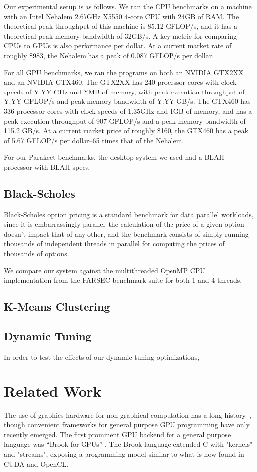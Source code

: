 \documentclass[preprint]{sigplanconf}
\begin{document}
Our experimental setup is as follows.  We ran the CPU benchmarks on a machine
with an Intel Nehalem 2.67GHz X5550 4-core CPU with 24GB of RAM.  The
theoretical peak throughput of this machine is 85.12 GFLOP/s, and it has a
theoretical peak memory bandwidth of 32GB/s.  A key metric for comparing CPUs
to GPUs is also performance per dollar.  At a current market rate of roughly
\$983, the Nehalem has a peak of 0.087 GFLOP/s per dollar.

For all GPU benchmarks, we ran the programs on both an NVIDIA GTX2XX and an
NVIDIA GTX460.  The GTX2XX has 240 processor cores with clock speeds of
Y.YY GHz and YMB of memory, with peak execution throughput of Y.YY GFLOP/s and
peak memory bandwidth of Y.YY GB/s.  The GTX460 has 336 processor cores with
clock speeds of 1.35GHz and 1GB of memory, and has a peak execution throughput
of 907 GFLOP/s and a peak memory bandwidth of 115.2 GB/s.  At a current market
price of roughly \$160, the GTX460 has a peak of 5.67 GFLOP/s per dollar--65
times that of the Nehalem.

For our Parakeet benchmarks, the desktop system we used had a BLAH processor
with BLAH specs.

\subsection{Black-Scholes}
Black-Scholes option pricing \cite{Blac73} is a standard benchmark for data
parallel workloads, since it is embarrassingly parallel--the calculation of the
price of a given option doesn't impact that of any other, and the benchmark
consists of simply running thousands of independent threads in parallel for
computing the prices of thousands of options.

We compare our system against the multithreaded OpenMP CPU implementation
from the PARSEC \cite{Bien08} benchmark suite for both 1 and 4 threads.

\subsection{K-Means Clustering}


\subsection{Dynamic Tuning}
In order to test the effects of our dynamic tuning optimizations, 

\section{Related Work}
\label{RelatedWork}
The use of graphics hardware for non-graphical computation has a long history~\cite{Lengyel90}, though convenient frameworks for general purpose GPU programming have only recently emerged.
The first prominent GPU backend for a general purpose language was ``Brook for GPUs'' \cite{Buck04}. The Brook language extended C with "kernels" and "streams", exposing a programming model similar to what is now found in CUDA and OpenCL. 
\end{document}
